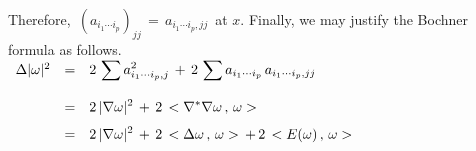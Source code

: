 \documentclass{article}[12pt,a4paper]
\begin{document}
Therefore, \,$(a_{i_1\cdots i_p})_{jj} \,=\, a_{i_1\cdots i_p,jj}$\, at $x$. 
Finally, we may justify the Bochner formula as follows. \\[0.1in]
$\begin{array}{rcl}
\Delta |\omega|^2 &=&\displaystyle 
	2\,\sum a_{i_1\cdots i_p,j}^2 \,+\, 2\,\sum a_{i_1\cdots i_p}\, a_{i_1\cdots i_p,jj} \\[0.2in]
&=& \displaystyle 
	2\, |\nabla \omega|^2 \,+\, 2\,<\nabla^\ast\nabla \omega \,,\, \omega> \\[0.1in]
&=& \displaystyle 
	2\, |\nabla \omega|^2 \,+\, 2\,<\Delta \omega \,,\, \omega> \,+\, 2\,<E(\omega) \,,\, \omega>
\end{array}$ 

\vfill
{}
\end{document}
